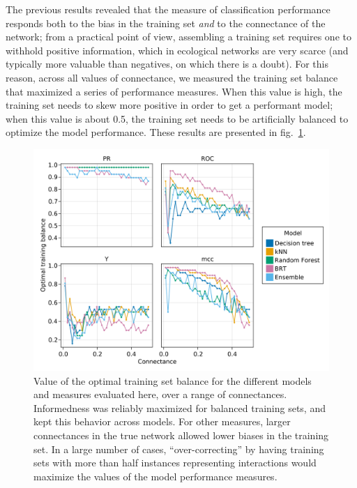 \documentclass[11pt]{article}
\makeatletter
\def\maxwidth{\ifdim\Gin@nat@width>\linewidth\linewidth
\else\Gin@nat@width\fi}
\let\Oldincludegraphics\includegraphics
\renewcommand{\includegraphics}[1]{\Oldincludegraphics[width=\maxwidth]{#1}}
\makeatother
\begin{document}
The previous results revealed that the measure of classification
performance responds both to the bias in the training set \emph{and} to
the connectance of the network; from a practical point of view,
assembling a training set requires one to withhold positive information,
which in ecological networks are very scarce (and typically more
valuable than negatives, on which there is a doubt). For this reason,
across all values of connectance, we measured the training set balance
that maximized a series of performance measures. When this value is
high, the training set needs to skew more positive in order to get a
performant model; when this value is about 0.5, the training set needs
to be artificially balanced to optimize the model performance. These
results are presented in fig.~\ref{fig:optimbias}.

\begin{figure}
\hypertarget{fig:optimbias}{%
\centering
\includegraphics{figures/optimal_bias.png}
\caption{Value of the optimal training set balance for the different
models and measures evaluated here, over a range of connectances.
Informedness was reliably maximized for balanced training sets, and kept
this behavior across models. For other measures, larger connectances in
the true network allowed lower biases in the training set. In a large
number of cases, ``over-correcting'' by having training sets with more
than half instances representing interactions would maximize the values
of the model performance measures.}\label{fig:optimbias}
}
\end{figure}
\end{document}
